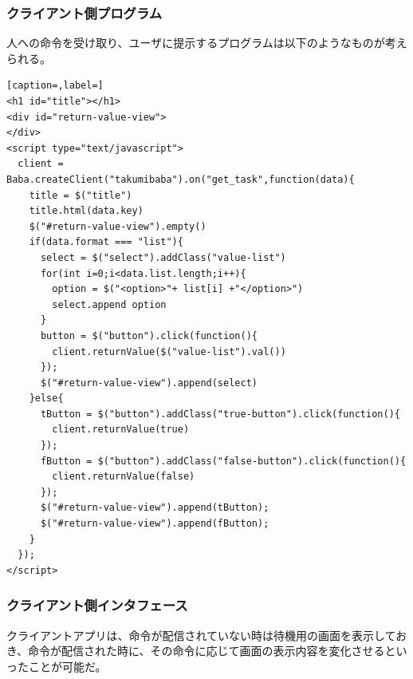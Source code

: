 \documentclass{deimj}
\begin{document}
\subsubsection{クライアント側プログラム}
人への命令を受け取り、ユーザに提示するプログラムは以下のようなものが考えられる。
\begin{lstlisting}[caption=,label=]
<h1 id="title"></h1>
<div id="return-value-view">
</div>
<script type="text/javascript">
  client = Baba.createClient("takumibaba").on("get_task",function(data){
    title = $("title")
    title.html(data.key)
    $("#return-value-view").empty()
    if(data.format === "list"){
      select = $("select").addClass("value-list")
      for(int i=0;i<data.list.length;i++){
        option = $("<option>"+ list[i] +"</option>")
        select.append option
      }
      button = $("button").click(function(){
        client.returnValue($("value-list").val())
      });
      $("#return-value-view").append(select)
    }else{
      tButton = $("button").addClass("true-button").click(function(){
        client.returnValue(true)
      });
      fButton = $("button").addClass("false-button").click(function(){
        client.returnValue(false)
      });
      $("#return-value-view").append(tButton);
      $("#return-value-view").append(fButton);
    }
  });
</script>
\end{lstlisting}
    
  
\subsubsection{クライアント側インタフェース}
クライアントアプリは、命令が配信されていない時は待機用の画面を表示しておき、命令が配信された時に、その命令に応じて画面の表示内容を変化させるといったことが可能だ。
\end{document}
